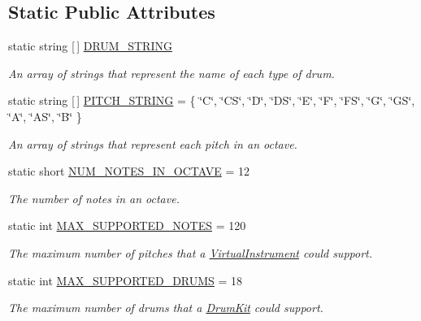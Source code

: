 \subsection*{Static Public Attributes}
\begin{DoxyCompactItemize}
\item 
static string \mbox{[}$\,$\mbox{]} \hyperlink{group___music_constants_ga1381281d147886a2cf3584ab0c7a67d6}{D\+R\+U\+M\+\_\+\+S\+T\+R\+I\+NG}
\begin{DoxyCompactList}\small\item\em An array of strings that represent the name of each type of drum. \end{DoxyCompactList}\item 
static string \mbox{[}$\,$\mbox{]} \hyperlink{group___music_constants_ga0f6eb5ac330d374c6b5021a0ba11c2bc}{P\+I\+T\+C\+H\+\_\+\+S\+T\+R\+I\+NG} = \{ \char`\"{}C\char`\"{}, \char`\"{}CS\char`\"{}, \char`\"{}D\char`\"{}, \char`\"{}DS\char`\"{}, \char`\"{}E\char`\"{}, \char`\"{}F\char`\"{}, \char`\"{}FS\char`\"{}, \char`\"{}G\char`\"{}, \char`\"{}GS\char`\"{}, \char`\"{}A\char`\"{}, \char`\"{}AS\char`\"{}, \char`\"{}B\char`\"{} \}
\begin{DoxyCompactList}\small\item\em An array of strings that represent each pitch in an octave. \end{DoxyCompactList}\item 
static short \hyperlink{group___music_constants_gab346f7d8791bf021799da7786cde44c1}{N\+U\+M\+\_\+\+N\+O\+T\+E\+S\+\_\+\+I\+N\+\_\+\+O\+C\+T\+A\+VE} = 12
\begin{DoxyCompactList}\small\item\em The number of notes in an octave. \end{DoxyCompactList}\item 
static int \hyperlink{group___music_constants_gaaf07da909a12e9fec0e43b70864f27b7}{M\+A\+X\+\_\+\+S\+U\+P\+P\+O\+R\+T\+E\+D\+\_\+\+N\+O\+T\+ES} = 120
\begin{DoxyCompactList}\small\item\em The maximum number of pitches that a \hyperlink{class_virtual_instrument}{Virtual\+Instrument} could support. \end{DoxyCompactList}\item 
static int \hyperlink{group___music_constants_gabce1a1ac5b9b6355af6bd7fb3868467a}{M\+A\+X\+\_\+\+S\+U\+P\+P\+O\+R\+T\+E\+D\+\_\+\+D\+R\+U\+MS} = 18
\begin{DoxyCompactList}\small\item\em The maximum number of drums that a \hyperlink{class_drum_kit}{Drum\+Kit} could support. \end{DoxyCompactList}\end{DoxyCompactItemize}


